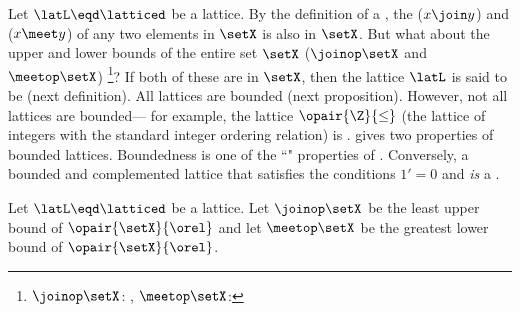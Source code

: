 Let $\latL\eqd\latticed$ be a lattice.
By the definition of a  ,
the  ($x \join y$) and  ($x\meet y$) of any two elements in $\setX$
is also in $\setX$.
But what about the upper and lower bounds
of the entire set $\setX$ ($\joinop\setX$ and $\meetop\setX$)%
\footnote{$\joinop\setX$: , $\meetop\setX$:}?
If both of these are in $\setX$, then the lattice $\latL$ is said to be
 (next definition).
All  lattices are bounded (next proposition).
However, not all lattices are bounded---%
for example, the lattice $\opair{\Z}{\le}$ (the lattice of integers 
with the standard integer ordering relation) is .
 gives two properties of bounded lattices.
Boundedness is one of the ``" properties
of .
Conversely, a bounded and complemented lattice that satisfies the conditions
$1'=0$ and  \emph{is} a .
\begin{definition}
\label{def:latb}
Let $\latL\eqd\latticed$ be a lattice.
Let $\joinop\setX$ be the least upper bound of $\opair{\setX}{\orel}$ and
let $\meetop\setX$ be the greatest lower bound of $\opair{\setX}{\orel}$.
\end{definition}

